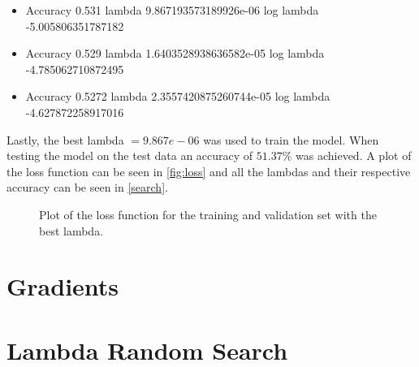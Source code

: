 \documentclass[12pt, a4paper]{article}
\begin{document}
\begin{itemize}
    \item Accuracy 0.531 lambda 9.867193573189926e-06 log lambda -5.005806351787182
    \item Accuracy 0.529 lambda 1.6403528938636582e-05 log lambda -4.785062710872495
    \item Accuracy 0.5272 lambda 2.3557420875260744e-05 log lambda -4.627872258917016
\end{itemize}

Lastly, the best lambda $=9.867e-06$ was used to train the model. When testing the model on the test data an accuracy of $51.37\%$ was achieved. A plot of the loss function can be seen in \autoref{fig:loss} and all the lambdas and their respective accuracy can be seen in \autoref{search}.

\begin{figure}[H]
    \scalebox{0.9}{}
    \caption{Plot of the loss function for the training and validation set with the best lambda.}
    \label{fig:loss}
\end{figure}

\newpage
\appendix
\section{Gradients}
\label{gradientData}

\section{Lambda Random Search}
\label{search}
\end{document}

